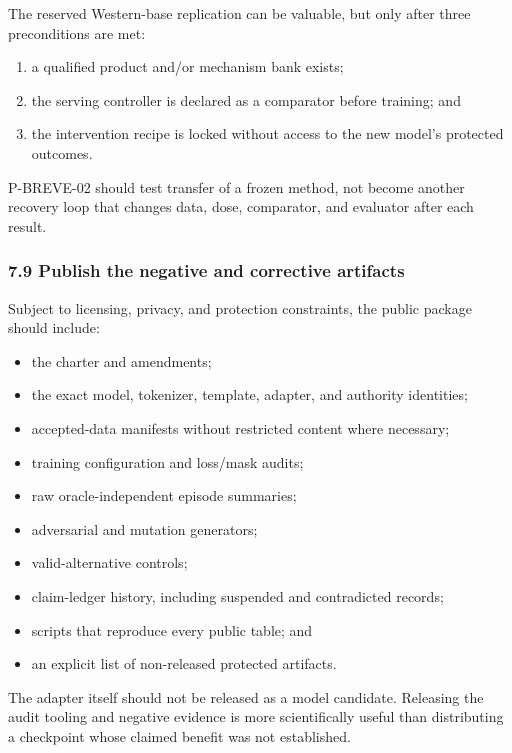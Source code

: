 \documentclass[
]{article}
\providecommand{\tightlist}{%
  \setlength{\itemsep}{0pt}\setlength{\parskip}{0pt}}
\begin{document}
The reserved Western-base replication can be valuable, but only after
three preconditions are met:

\begin{enumerate}
\def\labelenumi{\arabic{enumi}.}
\tightlist
\item
  a qualified product and/or mechanism bank exists;
\item
  the serving controller is declared as a comparator before training;
  and
\item
  the intervention recipe is locked without access to the new model's
  protected outcomes.
\end{enumerate}

P-BREVE-02 should test transfer of a frozen method, not become another
recovery loop that changes data, dose, comparator, and evaluator after
each result.

\subsubsection{7.9 Publish the negative and corrective
artifacts}\label{79-publish-the-negative-and-corrective-artifacts}

Subject to licensing, privacy, and protection constraints, the public
package should include:

\begin{itemize}
\tightlist
\item
  the charter and amendments;
\item
  the exact model, tokenizer, template, adapter, and authority
  identities;
\item
  accepted-data manifests without restricted content where necessary;
\item
  training configuration and loss/mask audits;
\item
  raw oracle-independent episode summaries;
\item
  adversarial and mutation generators;
\item
  valid-alternative controls;
\item
  claim-ledger history, including suspended and contradicted records;
\item
  scripts that reproduce every public table; and
\item
  an explicit list of non-released protected artifacts.
\end{itemize}

The adapter itself should not be released as a model candidate.
Releasing the audit tooling and negative evidence is more scientifically
useful than distributing a checkpoint whose claimed benefit was not
established.
\end{document}
